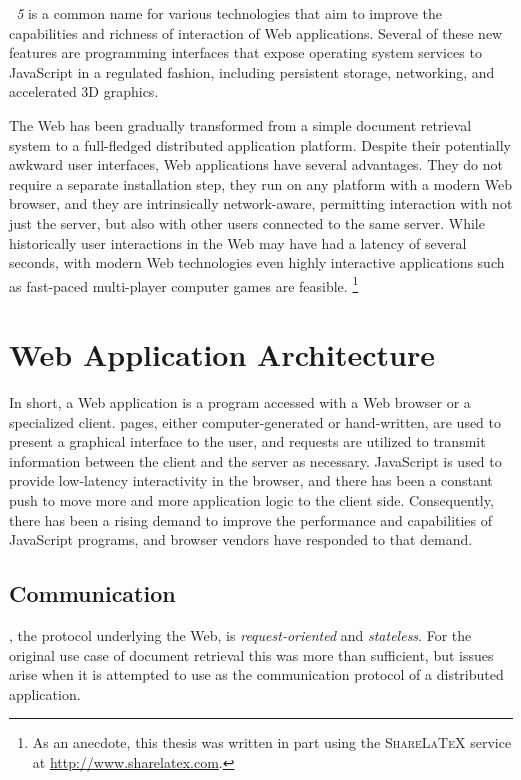 \emph{~5} is a common name for various technologies that aim to improve the capabilities and richness of interaction of Web applications. Several of these new features are programming interfaces that expose operating system services to JavaScript in a regulated fashion, including persistent storage, networking, and accelerated 3D graphics. \cite{HTML5}

The Web has been gradually transformed from a simple document retrieval system to a full-fledged distributed application platform. Despite their potentially awkward user interfaces, Web applications have several advantages. They do not require a separate installation step, they run on any platform with a modern Web browser, and they are intrinsically network-aware, permitting interaction with not just the server, but also with other users connected to the same server. While historically user interactions in the Web may have had a latency of several seconds, with modern Web technologies even highly interactive applications such as fast-paced multi-player computer games are feasible. \footnote{As an anecdote, this thesis was written in part using the \textsc{Share\LaTeX} service at \url{http://www.sharelatex.com}.}

\section{Web Application Architecture}

In short, a Web application is a program accessed with a Web browser or a specialized  client.  pages, either computer-generated or hand-written, are used to present a graphical interface to the user, and  requests are utilized to transmit information between the client and the server as necessary. JavaScript is used to provide low-latency interactivity in the browser, and there has been a constant push to move more and more application logic to the client side. Consequently, there has been a rising demand to improve the performance and capabilities of JavaScript programs, and browser vendors have responded to that demand.

\subsection{Communication}

, the protocol underlying the Web, is \emph{request-oriented} and \emph{stateless}. For the original use case of document retrieval this was more than sufficient, but issues arise when it is attempted to use as the communication protocol of a distributed application.

